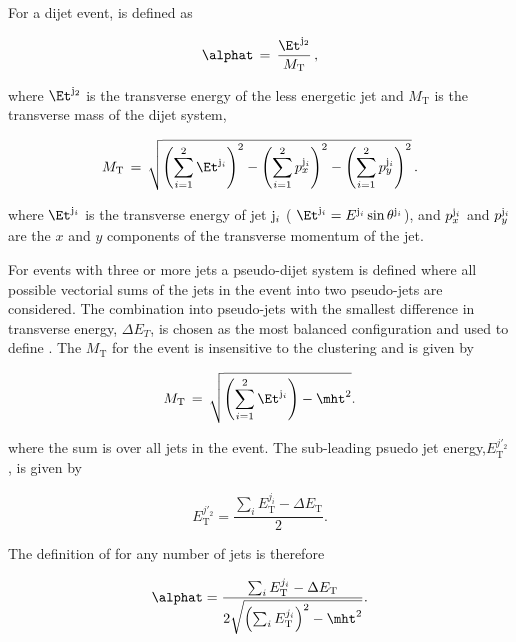 For a dijet event, \alphat is defined as

\begin{equation}
\label{eq:alphat}
\alphat\, =\, \frac{\Et^{{\rm j}_2}}{M_\text{T}} \, ,
\end{equation}

where $\Et^{\rm j_2}$ is the transverse energy of the 
less energetic jet and $M_\text{T}$ is the transverse
mass of the dijet system, 

\begin{equation}
  \label{eq:mt}
  M_\text{T}\, = \,\sqrt{ \left( \sum_{i=1}^2 \Et^{{\rm j}_i}
    \right)^2 - \left( \sum_{i=1}^2 p_x^{{\rm j}_i} \right)^2 - \left(
      \sum_{i=1}^2 p_y^{{\rm j}_i} \right)^2} \, .
\end{equation}

where $\Et^{{\rm j}_i}$ is the transverse energy of jet ${\rm j}_i$ (
$\Et^{{\rm j}_i} = E^{{\rm j}_i}\sin\theta^{{\rm j}_i}$), and
$p_x^{{\rm j}_i}$ and $p_y^{{\rm j}_i}$ are the $x$ and $y$ components
of the transverse momentum of the jet. 

For events with three or more jets a pseudo-dijet system is defined 
where all possible vectorial sums of the jets in the event into two
pseudo-jets are considered. The combination into pseudo-jets 
with the smallest difference in transverse energy, $\Delta E_T$, is chosen
as the most balanced configuration and used to define \alphat. The $M_\text{T}$ for 
the event is insensitive to the clustering and is given by

\begin{equation}
  \label{eq:mt}
  M_\text{T}\, = \,\sqrt{ \left( \sum_{i=1}^2 \Et^{{\rm{j}}_i}
    \right) - \mht^2}.
\end{equation}

where the sum is over all jets in the event. The sub-leading psuedo jet energy,$E_{\textrm{T}}^{j'_2}$, 
is given by

\begin{equation}
E_{\textrm{T}}^{j'_2} = \frac{\sum_{i} E_{\textrm{T}}^{j_i} - \Delta E_{\textrm{T}}}{2}.
\end{equation}

The definition of \alphat for any number of jets is therefore

\begin{equation}
  \label{eq:alphat2}
   \alphat = \frac{\sum_{i} E_{\textrm{T}}^{j_i} - \Delta E_{\textrm{T}}}{2\sqrt{\left(\sum_{i} E_{\textrm{T}}^{j_i}\right)^2 - \mht^2}}.
\end{equation}

